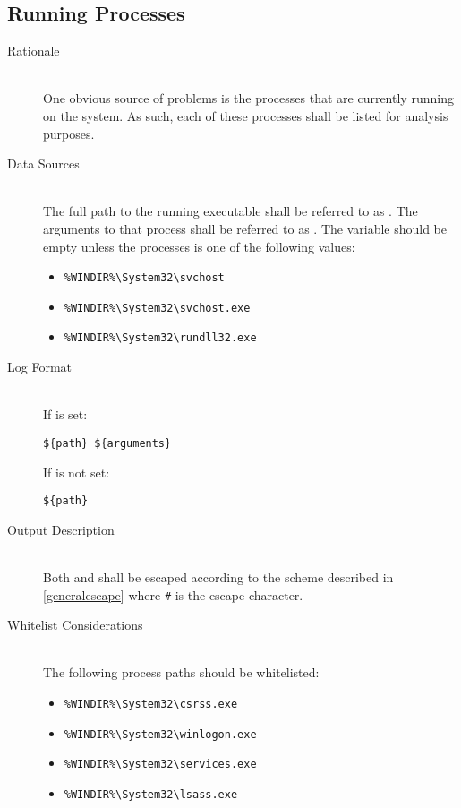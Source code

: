 \subsection{Running Processes}
\begin{description}
\item[Rationale] \hfill \\
One obvious source of problems is the processes that are currently running on
the system.  As such, each of these processes shall be listed for analysis
purposes.  
\item[Data Sources] \hfill \\
The full path to the running executable shall be referred to as .  The
arguments to that process shall be referred to as .  The
 variable should be empty unless the processes is one of the
following values:
\begin{itemize}
  \item \verb|%WINDIR%\System32\svchost|
  \item \verb|%WINDIR%\System32\svchost.exe|
  \item \verb|%WINDIR%\System32\rundll32.exe|
\end{itemize}
\item[Log Format] \hfill \\
If  is set:
\vspace{-\baselineskip}
\begin{verbatim}
${path} ${arguments}
\end{verbatim}
If  is not set:
\vspace{-\baselineskip}
\begin{verbatim}
${path} 
\end{verbatim}
\item[Output Description] \hfill \\
Both  and  shall be escaped according to the scheme
described in \ref{generalescape} where \verb|#| is the escape character.
\item[Whitelist Considerations] \hfill \\
The following process paths should be whitelisted:
\begin{itemize}
  \item \verb|%WINDIR%\System32\csrss.exe|
  \item \verb|%WINDIR%\System32\winlogon.exe|
  \item \verb|%WINDIR%\System32\services.exe|
  \item \verb|%WINDIR%\System32\lsass.exe|

\end{itemize}
\end{description}
